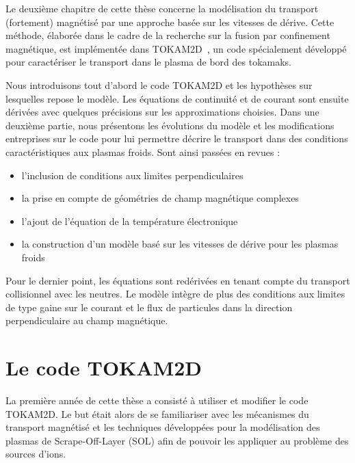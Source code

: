 \begin{refsection}
Le deuxième chapitre de cette thèse concerne la modélisation du transport
(fortement) magnétisé par une approche basée sur les vitesses de dérive. Cette
méthode, élaborée dans le cadre de la recherche sur la fusion par
confinement magnétique, est implémentée dans TOKAM2D~\cite{Sarazin}, un code 
spécialement développé pour caractériser le transport dans le plasma de bord
des tokamaks.

Nous introduisons tout d'abord le code TOKAM2D et les hypothèses sur
lesquelles repose le modèle. Les équations de continuité et de
courant sont ensuite dérivées avec quelques précisions sur les approximations
choisies.
Dans une deuxième partie, nous présentons les évolutions du
modèle et les modifications entreprises sur le code pour lui
permettre décrire le transport dans des conditions caractéristiques aux plasmas
froids. Sont ainsi passées en revues :

\begin{itemize}
  \item l'inclusion de conditions aux limites
perpendiculaires
\item la prise en compte de géométries de champ magnétique complexes
\item l'ajout de l'équation de la
température électronique
\item la construction d'un modèle basé sur les vitesses de dérive pour les plasmas froids
\end{itemize}

Pour le dernier point, les équations sont redérivées en tenant
compte du transport collisionnel avec les neutres. Le modèle intègre de plus des
conditions aux limites de type gaine sur le courant et le flux de particules
dans la direction perpendiculaire au champ magnétique.



\section{Le code TOKAM2D}

La première année de cette thèse a consisté à utiliser et modifier le
code {TOKAM2D}. Le but était alors de se familiariser avec les mécanismes du
transport magnétisé et les techniques développées pour la modélisation des
plasmas de Scrape-Off-Layer (SOL) afin
de pouvoir les appliquer au problème des sources d'ions. 


\end{refsection}
